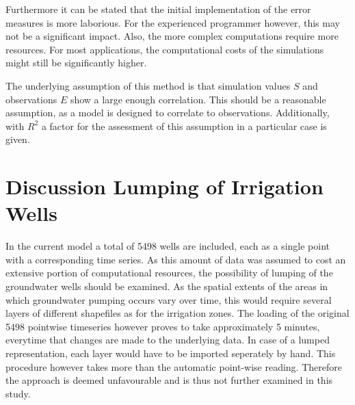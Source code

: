 Furthermore it can be stated that the initial implementation of the error measures is more laborious. 
For the experienced programmer however, this may not be a significant impact. 
Also, the more complex computations require more resources. 
For most applications, the computational costs of the simulations might still be significantly higher.

The underlying assumption of this method is that simulation values $S$ and observations $E$ show a large enough correlation. 
This should be a reasonable assumption, as a model is designed to correlate to observations. 
Additionally, with $R^2$ a factor for the assessment of this assumption in a particular case is given.


\section{Discussion Lumping of Irrigation Wells}
\label{Sec-DisLIW}

In the current model a total of 5498 wells are included, each as a single point with a corresponding time series. 
As this amount of data was assumed to cost an extensive portion of computational resources, the possibility of lumping of the groundwater wells should be examined. 
As the spatial extents of the areas in which groundwater pumping occurs vary over time, this would require several layers of different shapefiles as for the irrigation zones. 
The loading of the original 5498 pointwise timeseries however proves to take approximately 5 minutes, everytime that changes are made to the underlying data. 
In case of a lumped representation, each layer would have to be imported seperately by hand. 
This procedure however takes more than the automatic point-wise reading. 
Therefore the approach is deemed unfavourable and is thus not further examined in this study.